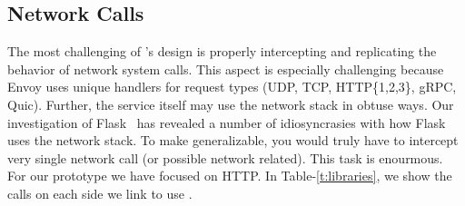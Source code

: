 \subsection{\sysname Network Calls}
The most challenging of \sysname's design is properly intercepting and replicating the behavior of network system calls.
This aspect is especially challenging because Envoy uses unique handlers for request types (UDP, TCP, HTTP\{1,2,3\}, gRPC, Quic).
Further, the service itself may use the network stack in obtuse ways.
Our investigation of Flask~\cite{flask} has revealed a number of idiosyncrasies with how Flask uses the network stack.
To make \sysname generalizable, you would truly have to intercept very single network call (or possible network related).
This task is enourmous.
For our prototype we have focused on HTTP.
In Table-\ref{t:libraries}, we show the calls on each side we link to use \sysname.


